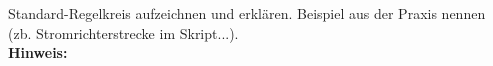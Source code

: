 \begin{question}[section=4,name={Standard Regelkreis},difficulty=,type=mdl,tags={}]
	Standard-Regelkreis aufzeichnen und erklären. Beispiel aus der Praxis nennen (zb. Stromrichterstrecke im Skript...).
	\\ \textbf{Hinweis:}\\
	
\end{question}
\begin{solution}
	
\end{solution}